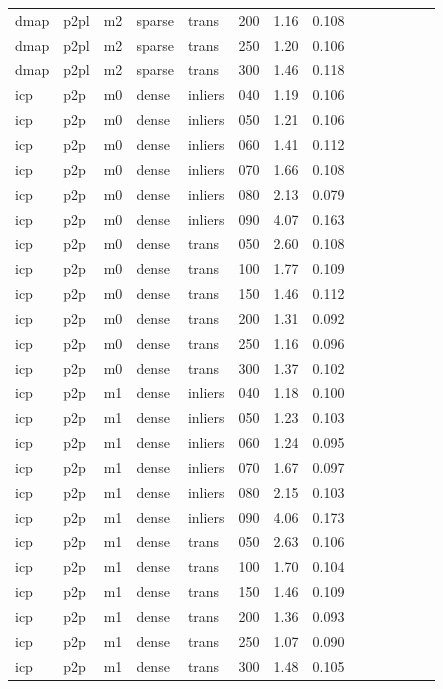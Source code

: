 \begin{table}[htbp]
\begin{tabular}{llllllrrrrrrrr}
  dmap & p2pl & m2 & sparse & trans & 200 & 1.16 & 0.108 \\
  dmap & p2pl & m2 & sparse & trans & 250 & 1.20 & 0.106 \\
  dmap & p2pl & m2 & sparse & trans & 300 & 1.46 & 0.118 \\
  icp & p2p & m0 & dense & inliers & 040 & 1.19 & 0.106 \\
  icp & p2p & m0 & dense & inliers & 050 & 1.21 & 0.106 \\
  icp & p2p & m0 & dense & inliers & 060 & 1.41 & 0.112 \\
  icp & p2p & m0 & dense & inliers & 070 & 1.66 & 0.108 \\
  icp & p2p & m0 & dense & inliers & 080 & 2.13 & 0.079 \\
  icp & p2p & m0 & dense & inliers & 090 & 4.07 & 0.163 \\
  icp & p2p & m0 & dense & trans & 050 & 2.60 & 0.108 \\
  icp & p2p & m0 & dense & trans & 100 & 1.77 & 0.109 \\
  icp & p2p & m0 & dense & trans & 150 & 1.46 & 0.112 \\
  icp & p2p & m0 & dense & trans & 200 & 1.31 & 0.092 \\
  icp & p2p & m0 & dense & trans & 250 & 1.16 & 0.096 \\
  icp & p2p & m0 & dense & trans & 300 & 1.37 & 0.102 \\
  icp & p2p & m1 & dense & inliers & 040 & 1.18 & 0.100 \\
  icp & p2p & m1 & dense & inliers & 050 & 1.23 & 0.103 \\
  icp & p2p & m1 & dense & inliers & 060 & 1.24 & 0.095 \\
  icp & p2p & m1 & dense & inliers & 070 & 1.67 & 0.097 \\
  icp & p2p & m1 & dense & inliers & 080 & 2.15 & 0.103 \\
  icp & p2p & m1 & dense & inliers & 090 & 4.06 & 0.173 \\
  icp & p2p & m1 & dense & trans & 050 & 2.63 & 0.106 \\
  icp & p2p & m1 & dense & trans & 100 & 1.70 & 0.104 \\
  icp & p2p & m1 & dense & trans & 150 & 1.46 & 0.109 \\
  icp & p2p & m1 & dense & trans & 200 & 1.36 & 0.093 \\
  icp & p2p & m1 & dense & trans & 250 & 1.07 & 0.090 \\
  icp & p2p & m1 & dense & trans & 300 & 1.48 & 0.105 \\

\end{tabular}
\end{table}

